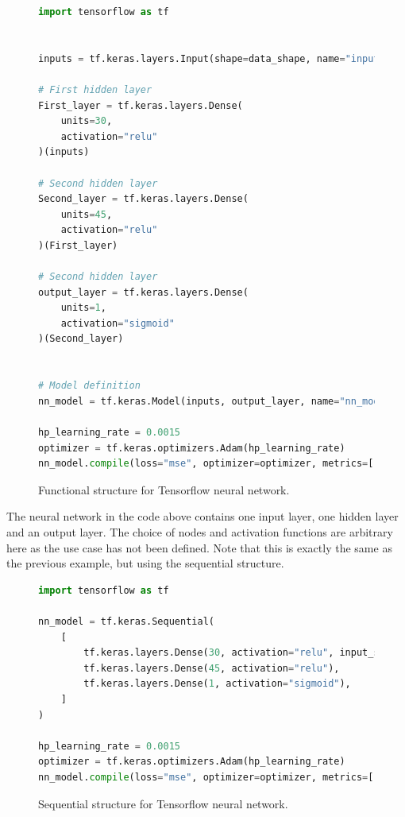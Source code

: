\begin{figure}[H]
    \centering
\begin{lstlisting}[language=Python, style=pythonstyle, label={code:python_func_example_general}]
import tensorflow as tf


inputs = tf.keras.layers.Input(shape=data_shape, name="input")

# First hidden layer
First_layer = tf.keras.layers.Dense(
    units=30,
    activation="relu"
)(inputs)

# Second hidden layer
Second_layer = tf.keras.layers.Dense(
    units=45, 
    activation="relu"
)(First_layer)

# Second hidden layer
output_layer = tf.keras.layers.Dense(
    units=1, 
    activation="sigmoid"
)(Second_layer)


# Model definition
nn_model = tf.keras.Model(inputs, output_layer, name="nn_model")

hp_learning_rate = 0.0015
optimizer = tf.keras.optimizers.Adam(hp_learning_rate)
nn_model.compile(loss="mse", optimizer=optimizer, metrics=["mse"]) 
\end{lstlisting}
\caption[Functional structure]{Functional structure for Tensorflow neural network.}
\label{code:functional}
\end{figure}
The neural network in the code above contains one input layer, one hidden layer and an output layer. The choice of nodes and activation functions are 
arbitrary here as the use case has not been defined. Note that this is exactly the same as the previous example, but using the sequential structure.

\begin{figure}[H]
    \centering
\begin{lstlisting}[language=Python, style=pythonstyle, label={code:python_seq_example}]
import tensorflow as tf

nn_model = tf.keras.Sequential(
    [
        tf.keras.layers.Dense(30, activation="relu", input_shape=data_shape),
        tf.keras.layers.Dense(45, activation="relu"),
        tf.keras.layers.Dense(1, activation="sigmoid"),
    ]
)

hp_learning_rate = 0.0015
optimizer = tf.keras.optimizers.Adam(hp_learning_rate)
nn_model.compile(loss="mse", optimizer=optimizer, metrics=["mse"]) 
\end{lstlisting}
\caption[Sequential structure]{Sequential structure for Tensorflow neural network.}
\label{code:sequatial}
\end{figure}

